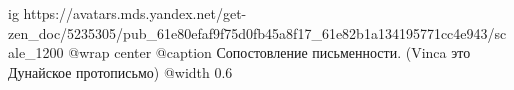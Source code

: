  
 
 
 
 

\ifcmt
  ig https://avatars.mds.yandex.net/get-zen_doc/5235305/pub_61e80efaf9f75d0fb45a8f17_61e82b1a134195771cc4e943/scale_1200
  @wrap center
  @caption Сопостовление письменности. (Vinca это Дунайское протописьмо)
  @width 0.6
\fi
